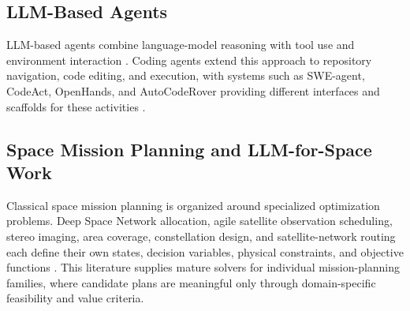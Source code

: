 \documentclass[11pt]{article}
\begin{document}
\subsection{LLM-Based Agents}



LLM-based agents combine language-model reasoning with tool use and environment interaction \citep{yao2022react,wangvoyager}. Coding agents extend this approach to repository navigation, code editing, and execution, with systems such as SWE-agent, CodeAct, OpenHands, and AutoCodeRover providing different interfaces and scaffolds for these activities \citep{yang2024sweagent,wang2024codeact,wang2024openhands,zhang2024autocoderover}.

\subsection{Space Mission Planning and LLM-for-Space Work}

Classical space mission planning is organized around specialized optimization problems. Deep Space Network allocation, agile satellite observation scheduling, stereo imaging, area coverage, constellation design, and satellite-network routing each define their own states, decision variables, physical constraints, and objective functions \citep{johnston2006automating,goh2022satnet,lemaitrea2002selecting,he2018improved,zezhong2023multiple,lee2024satellite,lyu2024dynamic}. This literature supplies mature solvers for individual mission-planning families, where candidate plans are meaningful only through domain-specific feasibility and value criteria.
\end{document}
